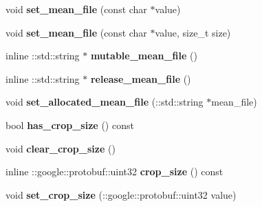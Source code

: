 \begin{DoxyCompactItemize}
\item 
\mbox{\label{classcaffe_1_1_data_parameter_adebde689fc2a0fddd3dfac1995365b71}} 
void {\bfseries set\+\_\+mean\+\_\+file} (const char $\ast$value)
\item 
\mbox{\label{classcaffe_1_1_data_parameter_a5d91661943787841d3d691f98229cd16}} 
void {\bfseries set\+\_\+mean\+\_\+file} (const char $\ast$value, size\+\_\+t size)
\item 
\mbox{\label{classcaffe_1_1_data_parameter_a998336b3e94aff8da3939d71cd77ce9a}} 
inline \+::std\+::string $\ast$ {\bfseries mutable\+\_\+mean\+\_\+file} ()
\item 
\mbox{\label{classcaffe_1_1_data_parameter_ab5783b5367be8464eab302f73c815ae9}} 
inline \+::std\+::string $\ast$ {\bfseries release\+\_\+mean\+\_\+file} ()
\item 
\mbox{\label{classcaffe_1_1_data_parameter_a8b0ecf33d64fbc4cdc15e9e50130f12b}} 
void {\bfseries set\+\_\+allocated\+\_\+mean\+\_\+file} (\+::std\+::string $\ast$mean\+\_\+file)
\item 
\mbox{\label{classcaffe_1_1_data_parameter_a46851ba97c6cb330343c84def63f0957}} 
bool {\bfseries has\+\_\+crop\+\_\+size} () const
\item 
\mbox{\label{classcaffe_1_1_data_parameter_a611d8c462098d62ca5a299a748e626f7}} 
void {\bfseries clear\+\_\+crop\+\_\+size} ()
\item 
\mbox{\label{classcaffe_1_1_data_parameter_ad336ec8a304c3a743b7e0c9bb9b6642e}} 
inline \+::google\+::protobuf\+::uint32 {\bfseries crop\+\_\+size} () const
\item 
\mbox{\label{classcaffe_1_1_data_parameter_ae4f596ba14be30274eaf8fcd532e5c01}} 
void {\bfseries set\+\_\+crop\+\_\+size} (\+::google\+::protobuf\+::uint32 value)
\item 
\mbox{\label{classcaffe_1_1_data_parameter_acac4adfc9b27131eac6ce160bbde1545}} 

\end{DoxyCompactItemize}
